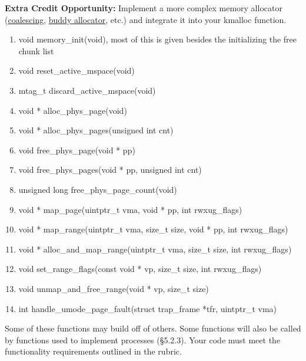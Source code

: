 \documentclass{article}
\begin{document}
    \textbf{Extra Credit Opportunity:} Implement a more complex memory allocator (\href{https://en.wikipedia.org/wiki/Coalescing_(computer_science)}{coalescing}, \href{https://en.wikipedia.org/wiki/Buddy_memory_allocation}{buddy allocator}, etc.) and
    integrate it into your {\fix kmalloc} function.

	\begin{enumerate}
		\item{{\fix void memory\_init(void)}}, most of this is given besides the initializing the free chunk list
		\item{{\fix void reset\_active\_mspace(void)}}
		\item{{\fix mtag\_t discard\_active\_mspace(void)}}
		\item{{\fix void * alloc\_phys\_page(void)}}
		\item{{\fix void * alloc\_phys\_pages(unsigned int cnt)}}
		\item{{\fix void free\_phys\_page(void * pp)}}
		\item{{\fix void free\_phys\_pages(void * pp, unsigned int cnt)}}
		\item{{\fix unsigned long free\_phys\_page\_count(void)}}
		\item{{\fix void * map\_page(uintptr\_t vma, void * pp, int rwxug\_flags)}}
		\item{{\fix void * map\_range(uintptr\_t vma, size\_t size, void * pp, int rwxug\_flags)}}
		\item{{\fix void * alloc\_and\_map\_range(uintptr\_t vma, size\_t size, int rwxug\_flags)}}
		\item{{\fix void set\_range\_flags(const void * vp, size\_t size, int rwxug\_flags)}}
		\item{{\fix void unmap\_and\_free\_range(void * vp, size\_t size)}}
        \item{{\fix int handle\_umode\_page\_fault(struct trap\_frame *tfr, uintptr\_t vma)}}

	\end{enumerate}

	Some of these functions may build off of others. Some functions will also be called by functions used to implement processes 
	(\S 5.2.3). Your code must meet the functionality requirements outlined in the rubric.
\end{document}
